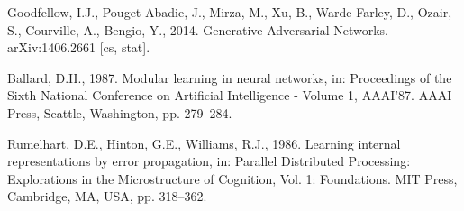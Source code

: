 \documentclass[conference]{IEEEtran}
\begin{document}
\begin{thebibliography}{00}
 Goodfellow, I.J., Pouget-Abadie, J., Mirza, M., Xu, B., Warde-Farley, D., Ozair, S., Courville, A., Bengio, Y., 2014. Generative Adversarial Networks. arXiv:1406.2661 [cs, stat].

 Ballard, D.H., 1987. Modular learning in neural networks, in: Proceedings of the Sixth National Conference on Artificial Intelligence - Volume 1, AAAI’87. AAAI Press, Seattle, Washington, pp. 279–284.

 Rumelhart, D.E., Hinton, G.E., Williams, R.J., 1986. Learning internal representations by error propagation, in: Parallel Distributed Processing: Explorations in the Microstructure of Cognition, Vol. 1: Foundations. MIT Press, Cambridge, MA, USA, pp. 318–362.

\end{thebibliography}
\end{document}
